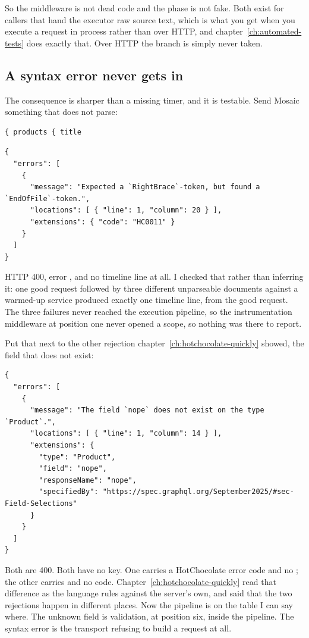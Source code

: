 So the middleware is not dead code and the phase is not fake. Both exist for
callers that hand the executor raw source text, which is what you get when you
execute a request in process rather than over HTTP, and
chapter~\ref{ch:automated-tests} does exactly that. Over HTTP the branch is
simply never taken.

\subsection*{A syntax error never gets in}

%
The consequence is sharper than a missing timer, and it is testable. Send
Mosaic something that does not parse:

\begin{verbatim}
{ products { title
\end{verbatim}

\begin{verbatim}
{
  "errors": [
    {
      "message": "Expected a `RightBrace`-token, but found a `EndOfFile`-token.",
      "locations": [ { "line": 1, "column": 20 } ],
      "extensions": { "code": "HC0011" }
    }
  ]
}
\end{verbatim}

HTTP 400, error , and no timeline line at all. I checked that
rather than inferring it: one good request followed by three different
unparseable documents against a warmed-up service produced exactly one timeline
line, from the good request. The three failures never reached the execution
pipeline, so the instrumentation middleware at position one never opened a
scope, so nothing was there to report.

%
Put that next to the other rejection chapter~\ref{ch:hotchocolate-quickly}
showed, the field that does not exist:

\begin{verbatim}
{
  "errors": [
    {
      "message": "The field `nope` does not exist on the type `Product`.",
      "locations": [ { "line": 1, "column": 14 } ],
      "extensions": {
        "type": "Product",
        "field": "nope",
        "responseName": "nope",
        "specifiedBy": "https://spec.graphql.org/September2025/#sec-Field-Selections"
      }
    }
  ]
}
\end{verbatim}

Both are 400. Both have no  key. One carries a HotChocolate error
code and no ; the other carries  and no
code. Chapter~\ref{ch:hotchocolate-quickly} read that difference as the language
rules against the server's own, and said that the two rejections happen in
different places. Now the pipeline is on the table I can say where. The unknown
field is validation, at position six, inside the pipeline. The syntax error is
the transport refusing to build a request at all.

